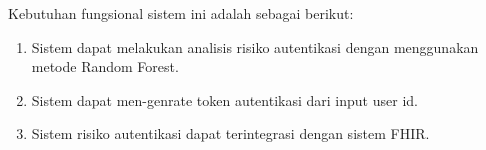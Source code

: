 Kebutuhan fungsional sistem ini adalah sebagai berikut:
\begin{enumerate}
    \item Sistem dapat melakukan analisis risiko autentikasi dengan menggunakan metode Random Forest.
    \item Sistem dapat men-genrate token autentikasi dari input user id.
    \item Sistem risiko autentikasi dapat terintegrasi dengan sistem FHIR.
\end{enumerate}